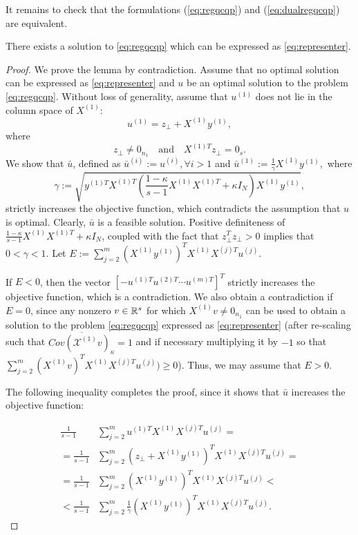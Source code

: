 It remains to check that the formulations (\ref{eq:regqcqp}) and (\ref{eq:dualregqcqp})
are equivalent.
\begin{lemma}
There exists a solution to \eqref{eq:regqcqp} which can be expressed as \eqref{eq:representer}.
\end{lemma}
\begin{proof}
We prove the lemma by contradiction. Assume that no optimal solution
can be expressed as \eqref{eq:representer} and $u$ be an optimal solution to the
problem \eqref{eq:regqcqp}. Without loss of generality, assume
that $u^{(1)}$ does not lie in the column space of $X^{(1)}$:
 $$u^{(1)} = z_{\bot} + X^{(1)} y^{(1)},$$
 where $$z_{\bot} \neq 0_{n_1}\quad \text{and}\quad X^{(1)T}z_{\bot} = 0_s.$$
We show that $\bar{u}$, defined as $\bar{u}^{(i)} := u^{(i)}, \forall i> 1$
and $\bar{u}^{(1)} := \frac{1}{\gamma}  X^{(1)} y^{(1)},$ where
\begin{equation*}
\gamma :=\sqrt{ y^{(1)T} X^{(1)T} \left(\frac{1- \kappa}{s - 1}X^{(1)} X^{(1)T} + \kappa  I_N\right) X^{(1)} y^{(1)} },
\end{equation*}
strictly increases the objective function, which contradicts the assumption
that $u$ is optimal. Clearly, $\bar{u}$ is a feasible solution. Positive
definiteness of $\frac{1- \kappa}{s - 1}X^{(1)} X^{(1)T} + \kappa  I_N$,
coupled with the fact that $z_{\bot}^T z_{\bot} > 0$ implies that
$0 < \gamma < 1$. Let $E := \sum_{j = 2}^m \left(X^{(1)} y^{(1)}\right)^T X^{(1)}X^{(j)T} u^{(j)}$.

If $E < 0$, then the vector $[-u^{(1)T} u^{(2)T} \cdots u^{(m)T}]^T$ strictly increases the
objective function, which is a contradiction. We also obtain a contradiction if $E = 0$,
since any nonzero $v \in \mathbb{R}^{s}$ for which $X^{(1)}v \neq 0_{n_1}$ can be used to obtain
a solution to the problem \eqref{eq:regqcqp} expressed as \eqref{eq:representer}
(after re-scaling  such that $\overline{Cov\left(\mathcal{X}^{(1)}v\right)_\kappa} = 1$
and if necessary multiplying it by $-1$ so that $\sum_{j = 2}^m \left(X^{(1)} v\right)^T X^{(1)}X^{(j)T} u^{(j)}) \geq 0$).
Thus, we may assume that $E > 0$.

The following inequality completes the proof, since it shows that $\bar{u}$ increases the objective function:

\begin{align*}
  \frac{1}{s -1} & \sum_{j = 2}^m u^{(1)T} X^{(1)}X^{(j)T} u^{(j)} =\\
= \frac{1}{s -1} & \sum_{j = 2}^m \left(z_{\bot} + X^{(1)} y^{(1)}\right)^T X^{(1)}X^{(j)T} u^{(j)} = \\
= \frac{1}{s -1}  &\sum_{j = 2}^m \left(X^{(1)} y^{(1)}\right)^T X^{(1)}X^{(j)T} u^{(j)} < \\
< \frac{1}{s -1}  &\sum_{j = 2}^m \frac{1}{\gamma}\left(X^{(1)} y^{(1)}\right)^T X^{(1)}X^{(j)T} u^{(j)}.
\end{align*}
\end{proof}

